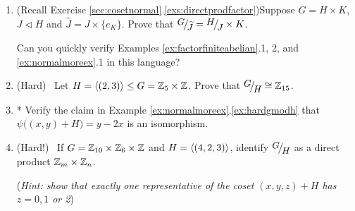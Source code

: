 \begin{exercises}
\begin{enumerate}
		
		\item\label{exs:normaldirectfactor} (Recall Exercise \ref*{sec:cosetnormal}.\ref{exs:directprodfactor})\lstsp Suppose $G=H\times K$, $J\triangleleft H$ and $\widehat J=J\times\{e_K\}$. Prove that $\quotient G{\widetilde J}=\quotient HJ\times K$.\par
		Can you quickly verify Examples \ref{ex:factorfiniteabelian}.1, 2, and \ref{ex:normalmoreex}.1 in this language?
		
		
		\item (Hard) \ Let $H=\left\langle (2,3)\right\rangle\le G=\mathbb{Z}_5\times \mathbb{Z}$. Prove that $\quotient GH\cong \Z_{15}$.
		
		
		\item* Verify the claim in Example \ref*{ex:normalmoreex}.\ref{ex:hardgmodh} that $\psi\bigl((x,y)+H\bigr)=y-2x$ is an isomorphism.
		
		
		\item (Hard!) \ If $G=\mathbb{Z}_{10}\times\mathbb{Z}_6\times\mathbb{Z}$ and $H=\left\langle (4,2,3)\right\rangle$, identify $\quotient GH$ as a direct product $\mathbb{Z}_m\times\mathbb{Z}_n$.\par
		(\emph{Hint: show that exactly one representative of the coset $(x,y,z)+H$ has $z= 0, 1$ or 2})
		
		
	

\end{enumerate}
\end{exercises}
